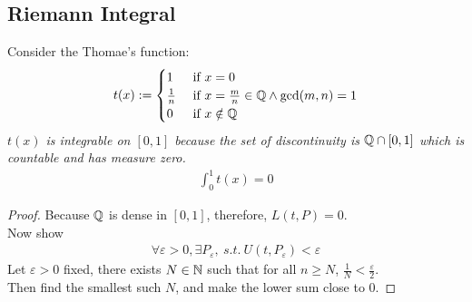 \documentclass[11pt]{article}
\begin{document}
	\subsection{Riemann Integral}
	\begin{example}
		Consider the Thomae's function:
		\begin{align}
			t(x) := \begin{cases}
				1 &\text{{ if }} x = 0 \\
				\frac{1}{n} &\text{{ if }} x = \frac{m}{n} \in \mathbb{Q} \land \gcd(m, n) = 1 \\
				0 &\text{{ if }} x \notin \mathbb{Q}
			\end{cases}
		\end{align}
		\emph{$t(x)$ is integrable on $[0, 1]$ because the set of discontinuity is $\mathbb{Q} \cap [0, 1]$ which is countable and has measure zero.}
		\begin{align}
			\int_0^1 t(x) = 0 
		\end{align}
	\end{example}
	
	\begin{proof}
		Because $\mathbb{Q}$ is dense in $[0, 1]$, therefore, $L(t, P) = 0$. \\
		Now show
		\begin{align}
			\forall \varepsilon > 0, \exists P_\varepsilon,\ s.t.\ U(t, P_\varepsilon) < \varepsilon
		\end{align}
		Let $\varepsilon > 0$ fixed, there exists $N \in \mathbb{N}$ such that for all $n \geq N$, $\frac{1}{N} < \frac{\varepsilon}{2}$. \\
		Then find the smallest such $N$, and make the lower sum close to 0.
	\end{proof}
\end{document}
